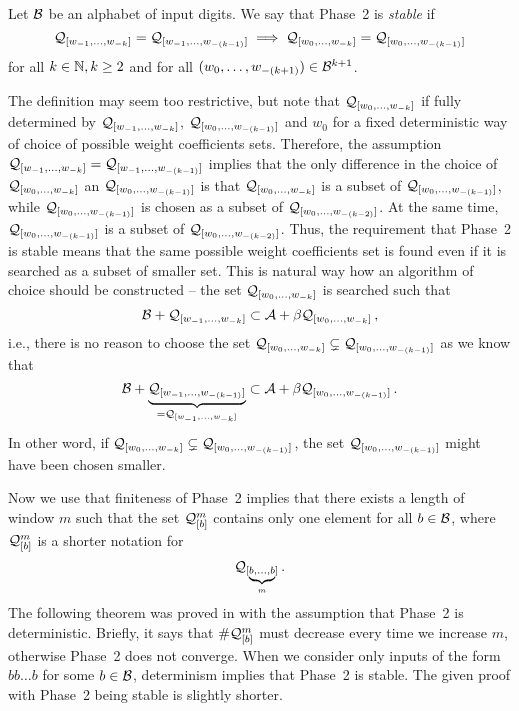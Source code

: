 \begin{defn}
Let $\B$ be an alphabet of input digits. We say that Phase~2 is \emph{stable} if 
$$
\Qw{1}{k}=\Qw{1}{(k-1)} \implies \Qwo{k}=\Qwo{(k-1)}
$$
for all $k\in\NN, k\geq 2$ and for all $\tupleo{(k+1)} \in \B^{k+1}$.

\end{defn}
The definition may seem too restrictive, but note that $\Qwo{k}$ if fully determined by $\Qw{1}{k}$, $\Qwo{(k-1)}$ and $w_0$ for a fixed deterministic way of choice of possible weight coefficients sets. Therefore, the assumption $\Qw{1}{k}=\Qw{1}{(k-1)}$ implies that the only difference in the choice of $\Qwo{k}$ an $\Qwo{(k-1)}$ is that $\Qwo{k}$ is a subset of  $\Qwo{(k-1)}$, while $\Qwo{(k-1)}$ is chosen as a subset of $\Qwo{(k-2)}$. At the same time, $\Qwo{(k-1)}$ is a subset of $\Qwo{(k-2)}$. Thus, the requirement that Phase~2 is stable means that the same possible weight coefficients set is found even if it is searched as a subset of smaller set. This is natural way how an algorithm of choice should be constructed -- the set $\Qwo{k}$ is searched such that
$$
\B+\Qw{1}{k} \subset \A+\beta \Qwo{k}\,,
$$
i.e., there is no reason to choose the set $\Qwo{k}\subsetneq\Qwo{(k-1)}$ as we know that
$$
\B+\underbrace{\Qw{1}{(k-1)}}_{=\Qw{1}{k}} \subset \A+\beta \Qwo{(k-1)}\,.
$$
In other word, if $\Qwo{k}\subsetneq\Qwo{(k-1)}$, the set $\Qwo{(k-1)}$ might have been chosen smaller.

Now we use that finiteness of Phase~2 implies that there exists a length of window $m$ such that the set $\Qb{m}$ contains only one element for all $b\in\B$, where $\Qb{m}$ is a shorter notation for
$$
\Q_{[\underbrace{\scriptstyle b,\dots,b}_m]}\,.
$$
The following theorem was proved in \cite{vu} with the assumption that Phase~2 is deterministic. Briefly, it says that $\#\Qb{m}$ must decrease every time we increase $m$, otherwise Phase~2 does not converge. When we consider only inputs of the form $bb\dots b$ for some $b\in\B$, determinism implies that Phase~2 is stable. The given proof with Phase~2 being stable is slightly shorter.

